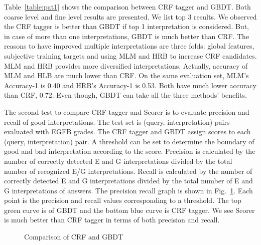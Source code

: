 \documentclass[11pt]{article}
\begin{document}
Table~\ref{table:pat1} shows the comparison between CRF tagger and GBDT. Both coarse level and fine level results are presented. We list top 3 results.
We observed the CRF tagger is better than GBDT if top 1 interpretation is considered. But, in case of more than one interpretations, GBDT is much better than CRF.  The reasons to have improved multiple interpretations are three folds: global features, subjective training targets and using MLM and HRB to increase CRF candidates. MLM and HRB provides more diversified interpretations. Actually, accuracy of MLM and HLB are much lower than CRF. On the same evaluation set, MLM's Accuracy-1 is 0.40 and HRB's Accuracy-1 is 0.53. Both have much lower accuracy than CRF, 0.72. Even though, GBDT can take all the three methods' benefits.  

The second test to compare CRF tagger and Scorer is to evaluate precision and recall of good interpretations. The test set is (query, interpretation) pairs evaluated with EGFB grades. The CRF tagger and GBDT assign scores to each (query, interpretation) pair. A threshold can be set to determine the boundary of good and bad interpretation according to the score. Precision is calculated by the number of correctly detected E and G interpretations divided by the total number of recognized E/G interpretations. Recall is calculated by the number of correctly detected E and G interpretations divided by the total number of E and G interpretations of answers. The precision recall graph is shown in Fig.~\ref{fig:precision}. Each point is the precision and recall values corresponding to a threshold. The top green curve is of GBDT and the bottom blue curve is CRF tagger. We see Scorer is much better than CRF tagger in terms of both precision and recall.


\begin{figure}
\centering
{}
\caption{Comparison of CRF and GBDT}
\label{fig:precision}
\end{figure}

 
\end{document}
